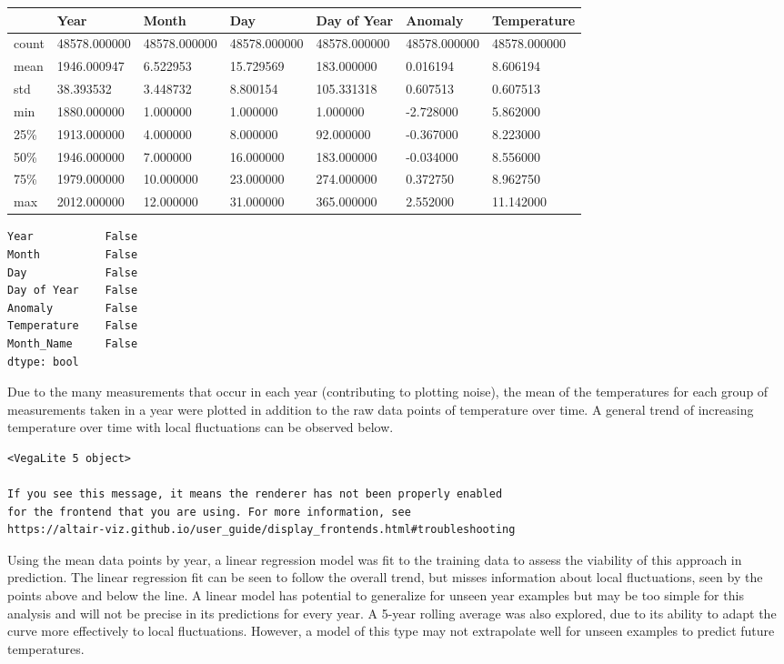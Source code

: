 \documentclass[
  letterpaper,
  DIV=11,
  numbers=noendperiod]{scrartcl}
\begin{document}
\begin{longtable}[]{@{}lllllll@{}}
\toprule\noalign{}
& Year & Month & Day & Day of Year & Anomaly & Temperature \\
\midrule\noalign{}
\endhead
\bottomrule\noalign{}
\endlastfoot
count & 48578.000000 & 48578.000000 & 48578.000000 & 48578.000000 &
48578.000000 & 48578.000000 \\
mean & 1946.000947 & 6.522953 & 15.729569 & 183.000000 & 0.016194 &
8.606194 \\
std & 38.393532 & 3.448732 & 8.800154 & 105.331318 & 0.607513 &
0.607513 \\
min & 1880.000000 & 1.000000 & 1.000000 & 1.000000 & -2.728000 &
5.862000 \\
25\% & 1913.000000 & 4.000000 & 8.000000 & 92.000000 & -0.367000 &
8.223000 \\
50\% & 1946.000000 & 7.000000 & 16.000000 & 183.000000 & -0.034000 &
8.556000 \\
75\% & 1979.000000 & 10.000000 & 23.000000 & 274.000000 & 0.372750 &
8.962750 \\
max & 2012.000000 & 12.000000 & 31.000000 & 365.000000 & 2.552000 &
11.142000 \\
\end{longtable}

\begin{verbatim}
Year           False
Month          False
Day            False
Day of Year    False
Anomaly        False
Temperature    False
Month_Name     False
dtype: bool
\end{verbatim}

Due to the many measurements that occur in each year (contributing to
plotting noise), the mean of the temperatures for each group of
measurements taken in a year were plotted in addition to the raw data
points of temperature over time. A general trend of increasing
temperature over time with local fluctuations can be observed below.

\begin{verbatim}
<VegaLite 5 object>

If you see this message, it means the renderer has not been properly enabled
for the frontend that you are using. For more information, see
https://altair-viz.github.io/user_guide/display_frontends.html#troubleshooting
\end{verbatim}

Using the mean data points by year, a linear regression model was fit to
the training data to assess the viability of this approach in
prediction. The linear regression fit can be seen to follow the overall
trend, but misses information about local fluctuations, seen by the
points above and below the line. A linear model has potential to
generalize for unseen year examples but may be too simple for this
analysis and will not be precise in its predictions for every year. A
5-year rolling average was also explored, due to its ability to adapt
the curve more effectively to local fluctuations. However, a model of
this type may not extrapolate well for unseen examples to predict future
temperatures.
\end{document}
